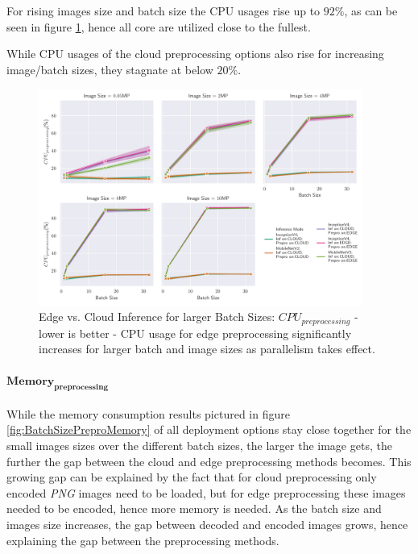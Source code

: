 For rising images size and batch size the CPU usages rise up to $92\%$, as can be seen in figure \ref{fig:BatchSizePreproCPU}, hence all core are utilized close to the fullest.


While CPU usages of the cloud preprocessing options also rise for increasing image/batch sizes, they stagnate at below $20\%$.
\begin{figure}[!htb]
\centering
\includegraphics[width=0.95\textwidth]{./Bilder/single_plots/batch_size_plots/Effects_of_Batch_size_Preprocessing_CPU_Usage.pdf}
\caption[Edge vs. Cloud Inference for larger Batch Sizes:  $CPU_{preprocessing}$ - lower is better]{Edge vs. Cloud Inference for larger Batch Sizes:  $CPU_{preprocessing}$ - lower is better - CPU usage for edge preprocessing significantly increases for larger batch and image sizes as parallelism takes effect. }
\label{fig:BatchSizePreproCPU}
\end{figure}

\paragraph{$\mathbf{Memory_{preprocessing}}$}
While the memory consumption results pictured in figure \ref{fig:BatchSizePreproMemory} of all deployment options stay close together for the small images sizes over the different batch sizes, the larger the image gets, the further the gap between the cloud and edge preprocessing methods becomes.
This growing gap can be explained by the fact that for cloud preprocessing only encoded \emph{PNG} images need to be loaded, but for edge preprocessing these images needed to be encoded, hence more memory is needed.
As the batch size and images size increases, the gap between decoded and encoded images grows, hence explaining the gap between the preprocessing methods.

